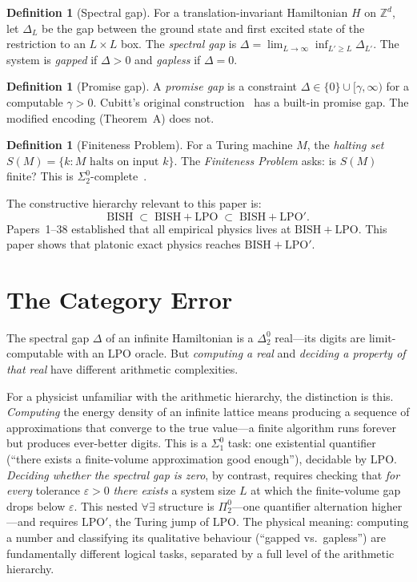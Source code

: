\documentclass[11pt,a4paper]{article}
\theoremstyle{plain}
\theoremstyle{definition}
\newtheorem{definition}[theorem]{Definition}
\newcommand{\ZZ}{\mathbb{Z}}
\newcommand{\LPO}{\ensuremath{\mathrm{LPO}}}
\newcommand{\LPOj}{\ensuremath{\mathrm{LPO'}}}
\newcommand{\BISH}{\ensuremath{\mathrm{BISH}}}
\begin{document}
\begin{definition}[Spectral gap]
For a translation-invariant Hamiltonian $H$ on $\ZZ^d$,
let $\Delta_L$ be the gap between the ground state and
first excited state of the restriction to an $L \times L$
box.  The \emph{spectral gap} is
$\Delta = \lim_{L \to \infty} \inf_{L' \geq L} \Delta_{L'}$.
The system is \emph{gapped} if $\Delta > 0$ and
\emph{gapless} if $\Delta = 0$.
\end{definition}

\begin{definition}[Promise gap]
A \emph{promise gap} is a constraint
$\Delta \in \{0\} \cup [\gamma, \infty)$ for a computable
$\gamma > 0$.  Cubitt's original construction~\cite{CPgW2015}
has a built-in promise gap.  The modified encoding
(Theorem~A) does not.
\end{definition}

\begin{definition}[Finiteness Problem]
For a Turing machine $M$, the \emph{halting set}
$S(M) = \{k : M \text{ halts on input } k\}$.
The \emph{Finiteness Problem} asks: is $S(M)$ finite?
This is $\Sigma_2^0$-complete~\cite{Rogers1967}.
\end{definition}

The constructive hierarchy relevant to this paper is:
\[
  \BISH \;\subset\; \BISH + \LPO \;\subset\; \BISH + \LPOj.
\]
Papers~1--38 established that all empirical physics lives at
$\BISH + \LPO$.  This paper shows that platonic exact physics
reaches $\BISH + \LPOj$.

\section{The Category Error}\label{sec:error}

The spectral gap $\Delta$ of an infinite Hamiltonian is a
$\Delta_2^0$ real---its digits are limit-computable with an
$\LPO$ oracle.  But \emph{computing a real} and
\emph{deciding a property of that real} have different
arithmetic complexities.

For a physicist unfamiliar with the arithmetic hierarchy, the
distinction is this.  \emph{Computing} the energy density of
an infinite lattice means producing a sequence of approximations
that converge to the true value---a finite algorithm runs forever
but produces ever-better digits.  This is a $\Sigma_1^0$ task:
one existential quantifier (``there exists a finite-volume
approximation good enough''), decidable by $\LPO$.
\emph{Deciding whether the spectral gap is zero}, by contrast,
requires checking that \emph{for every} tolerance $\varepsilon > 0$
\emph{there exists} a system size $L$ at which the finite-volume
gap drops below $\varepsilon$.  This nested $\forall\exists$
structure is $\Pi_2^0$---one quantifier alternation higher---and
requires $\LPOj$, the Turing jump of $\LPO$.  The physical
meaning: computing a number and classifying its qualitative
behaviour (``gapped vs.\ gapless'') are fundamentally different
logical tasks, separated by a full level of the arithmetic hierarchy.
\end{document}
